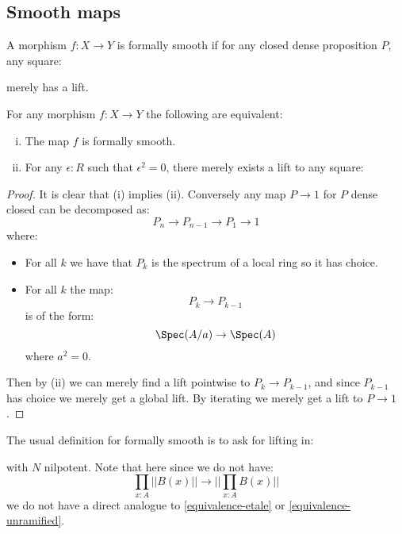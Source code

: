 
\subsection{Smooth maps}

\begin{definition}
A morphism $f:X\to Y$ is formally smooth if for any closed dense proposition $P$,
any square:
 \begin{center}
    \end{center}
merely has a lift.
\end{definition}

\begin{lemma}
For any morphism  $f:X\to Y$ the following are equivalent:
\begin{enumerate}[(i)]
\item The map $f$ is formally smooth. 
\item For any $\epsilon:R$ such that $\epsilon^2=0$, there merely exists a lift to any square:
 \begin{center}
    \end{center}
\end{enumerate}
\end{lemma}

\begin{proof}
It is clear that (i) implies (ii). Conversely any map $P\to 1$ for $P$ dense closed can be decomposed as:
\[P_n \to P_{n-1} \to P_1\to 1\]
where:
\begin{itemize}
\item For all $k$ we have that $P_k$ is the spectrum of a local ring so it has choice.
\item For all $k$ the map:
\[P_{k}\to P_{k-1}\]
is of the form:
\[\Spec(A/a)\to \Spec(A)\]
where $a^2=0$.
\end{itemize}
Then by (ii) we can merely find a lift pointwise to $P_k\to P_{k-1}$, and since $P_{k-1}$ has choice we merely get a global lift. By iterating we merely get a lift to $P\to 1$.
\end{proof}

\begin{remark}
The usual definition for formally smooth is to ask for lifting in:
 \begin{center}
    \end{center}
    with $N$ nilpotent. Note that here since we do not have: 
\[
\prod_{x:A} ||B(x)|| \to ||\prod_{x:A}B(x)||
\]
we do not have a direct analogue to \cref{equivalence-etale} or \cref{equivalence-unramified}.
\end{remark}

